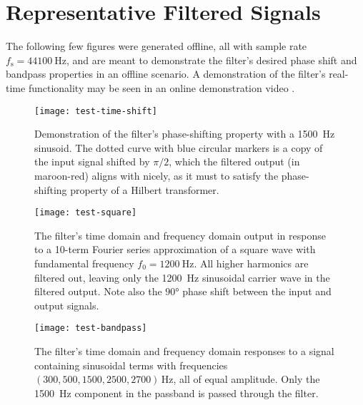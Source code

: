 \section{Representative Filtered Signals}
The following few figures were generated offline, all with sample rate $ f_{\mathrm{s}} = \SI{44100}{\hertz} $, and are meant to demonstrate the filter's desired phase shift and bandpass properties in an offline scenario.
A demonstration of the filter's real-time functionality may be seen in an online demonstration video .

\begin{figure}[htb!]
	\centering
	\texttt{[image: test-time-shift]}
    \vspace{-3ex}
	\caption{Demonstration of the filter's phase-shifting property with a \SI{1500}{\hertz} sinusoid.
    The dotted curve with blue circular markers is a copy of the input signal shifted by $ \pi/2 $, which the filtered output (in maroon-red) aligns with nicely, as it must to satisfy the phase-shifting property of a Hilbert transformer.}
	\label{fig:phase}
\end{figure}

\begin{figure}[htb!]
	\centering
	\texttt{[image: test-square]}
    \vspace{-5ex}
	\caption{The filter's time domain and frequency domain output in response to a 10-term Fourier series approximation of a square wave with fundamental frequency $ f_{0} = \SI{1200}{\hertz} $.
    All higher harmonics are filtered out, leaving only the \SI{1200}{\hertz} sinusoidal carrier wave in the filtered output.
    Note also the $ \ang{90} $ phase shift between the input and output signals.}
	\label{fig:square}
\end{figure}

\begin{figure}[htb!]
	\centering
	\texttt{[image: test-bandpass]}
    \vspace{-5ex}
	\caption{The filter's time domain and frequency domain responses to a signal containing sinusoidal terms with frequencies $ (300, 500, 1500, 2500, 2700) \, \si{\hertz} $, all of equal amplitude.
    Only the \SI{1500}{\hertz} component in the passband is passed through the filter.}
	\label{fig:bandpass}
\end{figure}

\clearpage
\printbibliography


